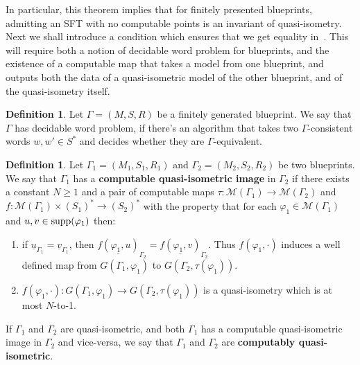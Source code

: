 \documentclass{article}
\theoremstyle{definition}
\newtheorem{defn}[theorem]{Definition} %
\theoremstyle{definition}
\newcommand{\supp}{\textnormal{supp}}
\newcommand{\define}[1]{\textbf{#1}}
\begin{document}
    In particular, this theorem implies that for finitely presented blueprints, admitting an SFT with no computable points is an invariant of quasi-isometry.\\

    Next we shall introduce a condition which ensures that we get equality in~. This will require both a notion of decidable word problem for blueprints, and the existence of a computable map that takes a model from one blueprint, and outputs both the data of a quasi-isometric model of the other blueprint, and of the quasi-isometry itself.

    \begin{defn}\label{def:WP_blueprints}
        Let $\Gamma=(M,S,R)$ be a finitely generated blueprint. We say that $\Gamma$ has decidable word problem, if there's an algorithm that takes two $\Gamma$-consistent words $w,w'\in S^*$ and decides whether they are $\Gamma$-equivalent.
    \end{defn}
        
    \begin{defn}\label{def:mega-super-uniform-qi}
        Let $\Gamma_1=(M_1,S_1,R_1)$ and $\Gamma_2=(M_2,S_2,R_2)$ be two blueprints. We say that $\Gamma_1$ has a \define{computable quasi-isometric image} in $\Gamma_2$ if there exists a constant $N \geq 1$ and a pair of computable maps $\tau \colon \mathcal{M}(\Gamma_1) \to \mathcal{M}(\Gamma_2)$ and $f \colon \mathcal{M}(\Gamma_1) \times (S_1)^* \to (S_2)^*$ with the property that for each $\varphi_1 \in \mathcal{M}(\Gamma_1)$ and $u,v \in \supp(\varphi_1)$ then:
        \begin{enumerate}
            \item if $\underline{u}_{\Gamma_1} = \underline{v}_{\Gamma_1}$, then $\underline{f(\varphi_1,u)}_{\Gamma_2} = \underline{f(\varphi_1,v)}_{\Gamma_2}$. Thus $f(\varphi_1,\cdot)$ induces a well defined map from $G(\Gamma_1,\varphi_1)$ to $G(\Gamma_2,\tau(\varphi_1))$.
            \item $f(\varphi_1,\cdot) \colon G(\Gamma_1,\varphi_1) \to G(\Gamma_2,\tau(\varphi_1))$ is a quasi-isometry which is at most $N$-to-1.
        \end{enumerate}
        If $\Gamma_1$ and $\Gamma_2$ are quasi-isometric, and both $\Gamma_1$ has a computable quasi-isometric image in $\Gamma_2$ and vice-versa, we say that $\Gamma_1$ and $\Gamma_2$ are \define{computably quasi-isometric}.
    \end{defn}
\end{document}

